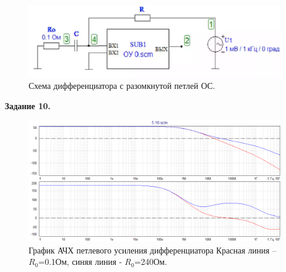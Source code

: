 \documentclass[a4paper,14pt]{extarticle}
\begin{document}
    \begin{figure}[h!]
        \begin{center}
            \includegraphics[scale=0.6]{24.png}
        \end{center}
        \vspace{-0.7cm}
        \caption{Схема дифференциатора с разомкнутой петлей ОС.}
    \end{figure}
 
    \newpage
    \begin{center}
        \textbf{Задание 10.}
    \end{center}
    \vspace{-1cm}
    \begin{figure}[h!]
        \begin{center}
            \includegraphics[scale=0.5]{25.png}
        \end{center}
        \vspace{-0.7cm}
        \caption{График АЧХ петлевого усиления дифференциатора Красная линия – $R_0$=0.1Ом, синяя линия - $R_0$=240Ом.}
    \end{figure}
 
\end{document}
